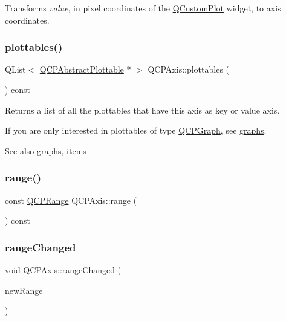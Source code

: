 Transforms {\itshape value}, in pixel coordinates of the \mbox{\hyperlink{class_q_custom_plot}{Q\+Custom\+Plot}} widget, to axis coordinates. \mbox{\label{class_q_c_p_axis_ac5e0f6f65c75efb5fd32275d6e4ef0d6}} 
\subsubsection{\texorpdfstring{plottables()}{plottables()}}
{\footnotesize\ttfamily Q\+List$<$ \mbox{\hyperlink{class_q_c_p_abstract_plottable}{Q\+C\+P\+Abstract\+Plottable}} $\ast$ $>$ Q\+C\+P\+Axis\+::plottables (\begin{DoxyParamCaption}{ }\end{DoxyParamCaption}) const}

Returns a list of all the plottables that have this axis as key or value axis.

If you are only interested in plottables of type \mbox{\hyperlink{class_q_c_p_graph}{Q\+C\+P\+Graph}}, see \mbox{\hyperlink{class_q_c_p_axis_ad590c0da223697a2727f97a520870fec}{graphs}}.

\begin{DoxySeeAlso}{See also}
\mbox{\hyperlink{class_q_c_p_axis_ad590c0da223697a2727f97a520870fec}{graphs}}, \mbox{\hyperlink{class_q_c_p_axis_a42761bc68e2f3a9f68549d45b73f705b}{items}} 
\end{DoxySeeAlso}
\mbox{\label{class_q_c_p_axis_ac4058855a81f1a883cf2e754f6a6acb1}} 
\subsubsection{\texorpdfstring{range()}{range()}}
{\footnotesize\ttfamily const \mbox{\hyperlink{class_q_c_p_range}{Q\+C\+P\+Range}} Q\+C\+P\+Axis\+::range (\begin{DoxyParamCaption}{ }\end{DoxyParamCaption}) const\hspace{0.3cm}{\ttfamily [inline]}}

\mbox{\label{class_q_c_p_axis_a0894084e4c16a1736534c4095746f910}} 
\subsubsection{\texorpdfstring{rangeChanged}{rangeChanged}\hspace{0.1cm}{\footnotesize\ttfamily [1/2]}}
{\footnotesize\ttfamily void Q\+C\+P\+Axis\+::range\+Changed (\begin{DoxyParamCaption}\item[{const \mbox{\hyperlink{class_q_c_p_range}{Q\+C\+P\+Range}} \&}]{new\+Range }\end{DoxyParamCaption})\hspace{0.3cm}{\ttfamily [signal]}}

